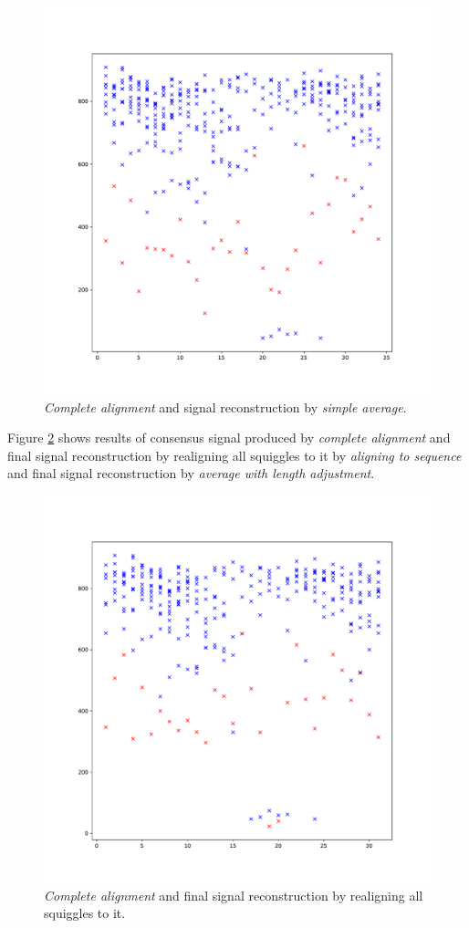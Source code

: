 \begin{figure}[h]
  \centering
  \includegraphics[width=1.0\textwidth]{images/final4}
  \caption{\textit{Complete alignment} and signal reconstruction by \textit{simple average}.}
  \label{fig:final4}
\end{figure}

Figure \ref{fig:final5} shows results of consensus signal produced by \textit{complete alignment} and 
final signal reconstruction by realigning all squiggles to it by \textit{aligning to sequence} and
final signal reconstruction by \textit{average with length adjustment}.

\begin{figure}[h]
  \centering
  \includegraphics[width=1.0\textwidth]{images/final5}
  \caption{\textit{Complete alignment} and final signal reconstruction by realigning all squiggles to it.}
  \label{fig:final5}
\end{figure}